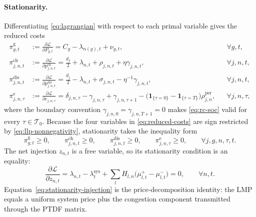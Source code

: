 \documentclass[11pt,a4paper,fleqn]{article}
\numberwithin{equation}{section}
\begin{document}
\paragraph{Stationarity.}
Differentiating \eqref{eq:lagrangian} with respect to each primal variable
gives the reduced costs
\begin{subequations}\label{eq:reduced-costs}
\begin{align}
\pi^{\mathrm{g}}_{g,t}
&:=\frac{\partial\mathcal L}{\partial P_{g,t}}
=C_g-\lambda_{n(g),t}+\nu_{g,t},
&& \forall g,t,
\label{eq:rc-generation}\\
\pi^{\mathrm{ch}}_{j,n,t}
&:=\frac{\partial\mathcal L}{\partial p^{\mathrm{ch}}_{j,n,t}}
=\tfrac{d_j}{2}+\lambda_{n,t}+\rho_{j,n,t}+\eta\gamma_{j,n,t},
&& \forall j,n,t,
\label{eq:rc-charge}\\
\pi^{\mathrm{dis}}_{j,n,t}
&:=\frac{\partial\mathcal L}{\partial p^{\mathrm{dis}}_{j,n,t}}
=\tfrac{d_j}{2}-\lambda_{n,t}+\sigma_{j,n,t}-\eta^{-1}\gamma_{j,n,t},
&& \forall j,n,t,
\label{eq:rc-discharge}\\
\pi^{\mathrm{e}}_{j,n,\tau}
&:=\frac{\partial\mathcal L}{\partial e_{j,n,\tau}}
=\delta_{j,n,\tau}-\gamma_{j,n,\tau}+\gamma_{j,n,\tau+1}
-\bigl(\mathbf 1_{\{\tau=0\}}-\mathbf 1_{\{\tau=T\}}\bigr)
\rho^{\mathrm{per}}_{j,n},
&& \forall j,n,\tau,
\label{eq:rc-soc}
\end{align}
\end{subequations}
where the boundary convention $\gamma_{j,n,0}=\gamma_{j,n,T+1}=0$ makes
\eqref{eq:rc-soc} valid for every $\tau\in\mathcal T_0$. Because the four
variables in \eqref{eq:reduced-costs} are sign restricted by
\eqref{eq:llp-nonnegativity}, stationarity takes the inequality form
\begin{equation}\label{eq:stationarity-inequalities}
\pi^{\mathrm{g}}_{g,t}\geq 0,
\qquad
\pi^{\mathrm{ch}}_{j,n,t}\geq 0,
\qquad
\pi^{\mathrm{dis}}_{j,n,t}\geq 0,
\qquad
\pi^{\mathrm{e}}_{j,n,\tau}\geq 0,
\qquad \forall j,g,n,\tau,t.
\end{equation}
The net injection $z_{n,t}$ is a free variable, so its stationarity condition
is an equality:
\begin{equation}\label{eq:stationarity-injection}
\frac{\partial\mathcal L}{\partial z_{n,t}}
=\lambda_{n,t}-\lambda^{\mathrm{sys}}_t
+\sum_l H_{l,n}\bigl(\mu^+_{l,t}-\mu^-_{l,t}\bigr)
=0,
\qquad \forall n,t.
\end{equation}
Equation~\eqref{eq:stationarity-injection} is the price-decomposition
identity: the LMP equals a uniform system price plus the congestion component
transmitted through the PTDF matrix.
\end{document}
